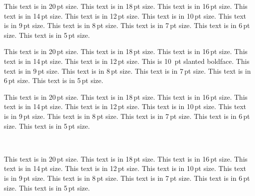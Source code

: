 {{{\nopagebreak
{\twentyitbf \fontss This text is in 20\,pt size.}
{\eighteenitbf \fontss This text is in 18\,pt size.}
{\sixteenitbf \fontss This text is in 16\,pt size.}
{\fourteenitbf \fontss This text is in 14\,pt size.}
{\twelveitbf \fontss This text is in 12\,pt size.}
{\itbf \fontss This text is in 10\,pt size.}
{\nineitbf \fontss This text is in 9\,pt size.}
{\eightitbf \fontss This text is in 8\,pt size.}
{\sevenitbf \fontss This text is in 7\,pt size.}
{\sixitbf \fontss This text is in 6\,pt size.}
{\fiveitbf \fontss This text is in 5\,pt size.}
\

\nopagebreak
{\twentyslbf \fontss This text is in 20\,pt size.}
{\eighteenslbf \fontss This text is in 18\,pt size.}
{\sixteenslbf \fontss This text is in 16\,pt size.}
{\fourteenslbf \fontss This text is in 14\,pt size.}
{\twelveslbf \fontss This text is in 12\,pt size.}
{\slbf \fontss This is 10 \,pt slanted boldface.}
{\nineslbf \fontss This text is in 9\,pt size.}
{\eightslbf \fontss This text is in 8\,pt size.}
{\sevenslbf \fontss This text is in 7\,pt size.}
{\sixslbf \fontss This text is in 6\,pt size.}
{\fiveslbf \fontss This text is in 5\,pt size.}
\

\nopagebreak
{\twentycaps \fontss This text is in 20\,pt size.}
{\eighteencaps \fontss This text is in 18\,pt size.}
{\sixteencaps \fontss This text is in 16\,pt size.}
{\fourteencaps \fontss This text is in 14\,pt size.}
{\twelvecaps \fontss This text is in 12\,pt size.}
{\caps \fontss This text is in 10\,pt size.}
{\ninecaps \fontss This text is in 9\,pt size.}
{\eightcaps \fontss This text is in 8\,pt size.}
{\sevencaps \fontss This text is in 7\,pt size.}
{\sixcaps \fontss This text is in 6\,pt size.}
{\fivecaps \fontss This text is in 5\,pt size.}

\

\nopagebreak
{\twentycapsbf \fontss This text is in 20\,pt size.}
{\eighteencapsbf \fontss This text is in 18\,pt size.}
{\sixteencapsbf \fontss This text is in 16\,pt size.}
{\fourteencapsbf \fontss This text is in 14\,pt size.}
{\twelvecapsbf \fontss This text is in 12\,pt size.}
{\capsbf \fontss This text is in 10\,pt size.}
{\ninecapsbf \fontss This text is in 9\,pt size.}
{\eightcapsbf \fontss This text is in 8\,pt size.}
{\sevencapsbf \fontss This text is in 7\,pt size.}
{\sixcapsbf \fontss This text is in 6\,pt size.}
{\fivecapsbf \fontss This text is in 5\,pt size.}
}













}}
